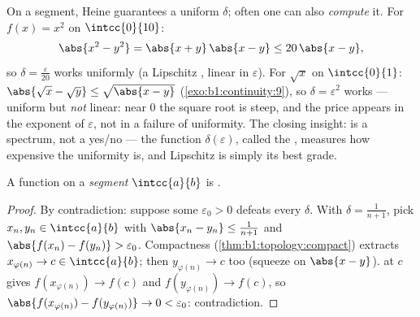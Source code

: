 \begin{example}\label{ex:b1:continuity:moduli}
On a segment, Heine guarantees a uniform $\delta$; often one can
also \emph{compute} it. For $f(x) = x^2$ on $\intcc{0}{10}$:
\[
\abs{x^2 - y^2} = \abs{x + y}\,\abs{x - y} \leq 20\,\abs{x - y},
\]
so $\delta = \frac{\varepsilon}{20}$ works uniformly (a
Lipschitz , linear in $\varepsilon$). For $\sqrt x$ on
$\intcc{0}{1}$: $\abs{\sqrt x - \sqrt y} \leq \sqrt{\abs{x -
y}}$ (\cref{exo:b1:continuity:9}), so $\delta = \varepsilon^2$
works --- uniform but \emph{not} linear: near $0$ the square
root is steep, and the price appears in the exponent of
$\varepsilon$, not in a failure of uniformity. The closing
insight:  is a spectrum, not a yes/no ---
the function $\delta(\varepsilon)$, called the , measures
how expensive the uniformity is, and Lipschitz is simply its
best grade.
\end{example}

\begin{theorem}[Heine]\label{thm:b1:continuity:heine}
A  function on a \emph{segment} $\intcc{a}{b}$ is .
\end{theorem}

\begin{proof}
By contradiction: suppose some $\varepsilon_0 > 0$ defeats every
$\delta$. With $\delta = \frac{1}{n+1}$, pick $x_n, y_n \in
\intcc{a}{b}$ with $\abs{x_n - y_n} \leq \frac{1}{n+1}$ and
$\abs{f(x_n) - f(y_n)} > \varepsilon_0$. Compactness
(\cref{thm:b1:topology:compact}) extracts $x_{\varphi(n)} \to c \in
\intcc{a}{b}$; then $y_{\varphi(n)} \to c$ too (squeeze on $\abs{x -
y}$).  at $c$ gives $f(x_{\varphi(n)}) \to f(c)$ and
$f(y_{\varphi(n)}) \to f(c)$, so $\abs{f(x_{\varphi(n)}) -
f(y_{\varphi(n)})} \to 0 < \varepsilon_0$: contradiction.
\end{proof}

